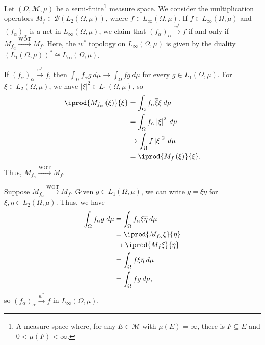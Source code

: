 \documentclass[10pt]{mypackage}
\begin{document}
\begin{example}
  Let $\left(\Omega,\mathcal{M},\mu\right)$ be a semi-finite\footnote{A measure space where, for any $E\in \mathcal{M}$ with $\mu(E) = \infty$, there is $F\subseteq E$ and $0 < \mu(F) < \infty$.} measure space. We consider the multiplication operators $M_{f}\in \mathcal{B}\left(L_{2}\left(\Omega,\mu\right)\right)$, where $f\in L_{\infty}\left(\Omega,\mu\right)$. If $f\in L_{\infty}\left(\Omega,\mu\right)$ and $\left(f_{\alpha}\right)_{\alpha}$ is a net in $L_{\infty}\left(\Omega,\mu\right)$, we claim that $\left(f_{\alpha}\right)_{\alpha}\xrightarrow{w^{\ast}}f$ if and only if $M_{f_{\alpha}}\xrightarrow{\text{WOT}}M_{f}$. Here, the $w^{\ast}$ topology on $L_{\infty}\left(\Omega,\mu\right)$ is given by the duality $\left(L_{1}\left(\Omega,\mu\right)\right)^{\ast}\cong L_{\infty}\left(\Omega,\mu\right)$.\newline

  If $\left(f_{\alpha}\right)_{\alpha}\xrightarrow{w^{\ast}}f$, then $\int_{\Omega}^{} f_{\alpha}g\:d\mu\rightarrow \int_{\Omega}^{} fg\:d\mu$ for every $g\in L_{1}\left(\Omega,\mu\right)$. For $\xi\in L_{2}\left(\Omega,\mu\right)$, we have $\left\vert \xi \right\vert^2\in L_{1}\left(\Omega,\mu\right)$, so
  \begin{align*}
    \iprod{M_{f_{\alpha}}\left(\xi\right)}{\xi} &= \int_{\Omega}^{} f_{\alpha}\overline{\xi}\xi\:d\mu\\
                                                &= \int_{\Omega}^{} f_{\alpha}\left\vert \xi \right\vert^2\:d\mu\\
                                                &\rightarrow \int_{\Omega}^{} f\left\vert \xi \right\vert^2\:d\mu\\
                                                &= \iprod{M_{f}\left(\xi\right)}{\xi}.
  \end{align*}
  Thus, $M_{f_{\alpha}}\xrightarrow{\text{WOT}} M_{f}$.\newline

  Suppose $M_{f_{\alpha}}\xrightarrow{\text{WOT}}M_{f}$. Given $g\in L_{1}\left(\Omega,\mu\right)$, we can write $g = \xi \overline{\eta}$ for $\xi,\eta \in L_{2}\left(\Omega,\mu\right)$. Thus, we have
  \begin{align*}
    \int_{\Omega}^{} f_{\alpha}g\:d\mu &= \int_{\Omega}^{} f_{\alpha}\xi \overline{\eta}\:d\mu\\
                                       &= \iprod{M_{f_{\alpha}}\xi}{\eta}\\
                                       &\rightarrow \iprod{M_{f}\xi}{\eta}\\
                                       &= \int_{\Omega}^{} f \xi \overline{\eta}\:d\mu\\
                                       &= \int_{\Omega}^{} fg\:d\mu,
  \end{align*}
  so $\left(f_{\alpha}\right)_{\alpha}\xrightarrow{w^{\ast}}f$ in $L_{\infty}\left(\Omega,\mu\right)$.\newline


\end{example}
\end{document}
